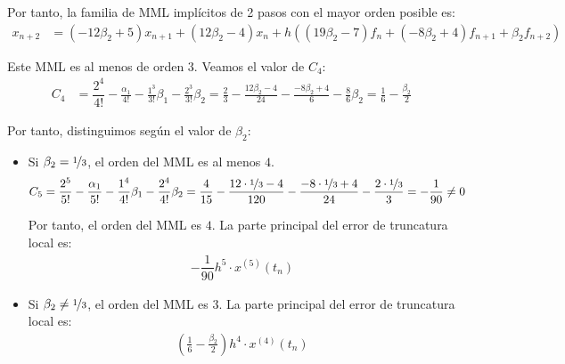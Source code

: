 \begin{ejercicio}
    Por tanto, la familia de MML implícitos de 2 pasos con el mayor orden posible es:
    \begin{align*}
        x_{n+2} &= (-12\beta_2 + 5)x_{n+1} + (12\beta_2 - 4)x_n + h\left((19\beta_2 - 7)f_n + (-8\beta_2 + 4)f_{n+1} + \beta_2 f_{n+2}\right)
    \end{align*}

    Este MML es al menos de orden 3. Veamos el valor de $C_4$:
    \begin{align*}
        C_4 &= \dfrac{2^4}{4!} -\frac{\alpha_1}{4!} - \frac{1^3}{3!}\beta_1- \frac{2^3}{3!}\beta_2
        = \frac{2}{3} - \frac{12\beta_2-4}{24} - \frac{-8\beta_2+4}{6} - \frac{8}{6}\beta_2
        = \frac{1}{6} - \frac{\beta_2}{2}
    \end{align*}

    Por tanto, distinguimos según el valor de $\beta_2$:
    \begin{itemize}
        \item Si $\beta_2=\nicefrac{1}{3}$, el orden del MML es al menos $4$.
        \begin{align*}
            C_5 &= \dfrac{2^5}{5!} -\frac{\alpha_1}{5!} - \frac{1^4}{4!}\beta_1- \frac{2^4}{4!}\beta_2
            = \frac{4}{15} - \frac{12\cdot \nicefrac{1}{3}-4}{120} - \frac{-8\cdot \nicefrac{1}{3}+4}{24} - \frac{2\cdot \nicefrac{1}{3}}{3}
            = -\dfrac{1}{90}\neq 0
        \end{align*}

        Por tanto, el orden del MML es $4$. La parte principal del error de truncatura local es:
        \begin{align*}
            -\dfrac{1}{90}h^5\cdot x^{(5)}(t_n)
        \end{align*}
        \item Si $\beta_2\neq \nicefrac{1}{3}$, el orden del MML es $3$. La parte principal del error de truncatura local es:
        \begin{align*}
            \left(\frac{1}{6} - \frac{\beta_2}{2}\right)h^4\cdot x^{(4)}(t_n)
        \end{align*}
    \end{itemize}


\end{ejercicio}
